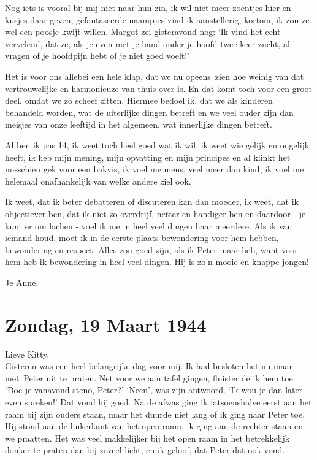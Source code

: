 \documentclass{book}
\begin{document}
Nog iets is vooral bij mij niet naar hun zin, ik wil niet meer zoentjes hier en
kusjes daar geven, gefantaseerde naampjes vind ik aanstellerig, kortom, ik zou
ze wel een poosje kwijt willen. Margot zei gisteravond nog: `Ik vind het echt
vervelend, dat ze, als je even met je hand onder je hoofd twee keer zucht, al
vragen of je hoofdpijn hebt of je niet goed voelt!'

Het is voor ons allebei een hele klap, dat we nu opeens~zien hoe weinig van dat
vertrouwelijke en harmonieuze van thuis over is. En dat komt toch voor een groot
deel, omdat we zo scheef zitten. Hiermee bedoel ik, dat we als kinderen
behandeld worden, wat de uiterlijke dingen betreft en we veel ouder zijn dan
meisjes van onze leeftijd in het algemeen, wat innerlijke dingen betreft.

Al ben ik pas 14, ik weet toch heel goed wat ik wil, ik weet wie gelijk en
ongelijk heeft, ik heb mijn mening, mijn opvatting en mijn principes en al
klinkt het misschien gek voor een bakvis, ik voel me mens, veel meer dan kind,
ik voel me helemaal onafhankelijk van welke andere ziel ook.

Ik weet, dat ik beter debatteren of discuteren kan dan moeder, ik weet, dat ik
objectiever ben, dat ik niet zo overdrijf, netter en handiger ben en daardoor -
je kunt er om lachen - voel ik me in heel veel dingen haar meerdere. Als ik van
iemand houd, moet ik in de eerste plaats bewondering voor hem hebben,
bewondering en respect. Alles zou goed zijn, als ik Peter maar heb, want voor
hem heb ik bewondering in heel veel dingen. Hij is zo'n mooie en knappe jongen!

Je Anne.

\section*{Zondag, 19 Maart 1944}

Lieve Kitty,\\
Gisteren was een heel belangrijke dag voor mij. Ik had besloten
het nu maar met~Peter uit te praten. Net voor we aan tafel gingen, fluister de
ik hem toe: `Doe je vanavond steno, Peter?' `Neen', was zijn antwoord. `Ik wou
je dan later even spreken!' Dat vond hij goed. Na de afwas ging ik fatsoenshalve
eerst aan het raam bij zijn ouders staan, maar het duurde niet lang of ik ging
naar Peter toe. Hij stond aan de linkerkant van het open raam, ik ging aan de
rechter staan en we praatten. Het was veel makkelijker bij het open raam in het
betrekkelijk donker te praten dan bij zoveel licht, en ik geloof, dat Peter dat
ook vond.
\end{document}
